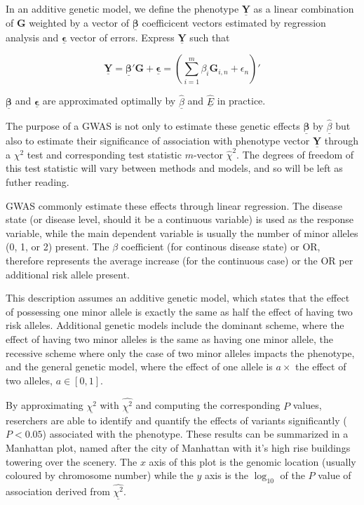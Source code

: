 In an additive genetic model, we define the phenotype $\underline{\mathbf{Y}}$ as a linear combination of $\mathbf{G}$ weighted by a vector of $\underline{\mathbf{\beta}}$ coefficicent vectors estimated by regression analysis and $\underline{\mathbf{\epsilon}}$ vector of errors. Express $\underline{\mathbf{Y}}$ such that

$$ \underline{\mathbf{Y}} = \underline{\mathbf{\beta}}' \mathbf{G} + \underline{\mathbf{\epsilon}} = \left( \sum^m_{i=1} \beta_i \mathbf{G}_{i, n} + \epsilon_n \right)' $$

$\underline{\mathbf{\beta}}$ and $\underline{\mathbf{\epsilon}}$ are approximated optimally by $\underline{\hat{\beta}}$ and $\underline{\hat{E}}$ in practice.

The purpose of a \ac{GWAS} is not only to estimate these genetic effects $\underline{\mathbf{\beta}}$ by $\underline{\hat{\beta}}$ but also to estimate their significance of association with phenotype vector $\underline{\mathbf{Y}}$ through a $\chi^2$ test and corresponding test statistic $m$-vector $\hat{\chi}^2$. The degrees of freedom of this test statistic will vary between methods and models, and so will be left as futher reading. 

\ac{GWAS} commonly estimate these effects through linear regression. The disease state (or disease level, should it be a continuous variable) is used as the response variable, while the main dependent variable is usually the number of minor alleles (0, 1, or 2) present.  The $\beta$ coefficient (for continous disease state) or \ac{OR}, therefore represents the average increase (for the continuous case) or the \ac{OR} per additional risk allele present. 


\begin{rem} This description assumes an additive genetic model, which states that the effect of possessing one minor allele is exactly the same as half the effect of having two risk alleles. Additional genetic models include the dominant scheme, where the effect of having two minor alleles is the same as having one minor allele, the recessive scheme where only the case of two minor alleles impacts the phenotype, and the general genetic model, where the effect of one allele is $a \times$ the effect of two alleles, $a \in [0,1]$. \end{rem}
 
By approximating $\underline{\chi^2}$ with $\hat{\underline{\chi^2}}$ and computing the corresponding $P$ values, reserchers are able to identify and quantify the effects of variants significantly ($P < 0.05$) associated with the phenotype. These results can be summarized in a Manhattan plot, named after the city of Manhattan with it's high rise buildings towering over the scenery. The $x$ axis of this plot is the genomic location (usually coloured by chromosome number) while the $y$ axis is the $\log_{10}$ of the $P$ value of association derived from $\hat{\underline{\chi^2}}$. 


